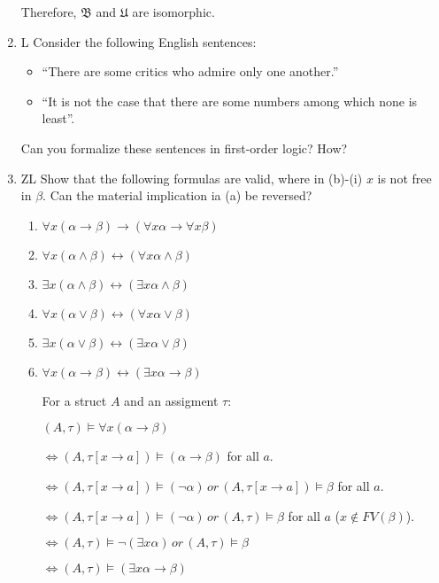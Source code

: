 \documentclass[12pt]{article}
\begin{document}
\begin{enumerate}
     Therefore, $\mathfrak{B}$ and $\mathfrak{U}$ are isomorphic.
		\item
		L Consider the following English sentences:
		\begin{itemize}
			\item
			``There are some critics who admire only one another.''
			\item
			``It is not the case that there are some numbers among which none is
			least''.
		\end{itemize}
		Can you formalize these sentences in first-order logic? How?
		\item
		ZL Show that the following formulas are valid,
		where in (b)-(i) $x$ is not free in $\beta$.
		Can the material implication ia (a) be reversed?
		\begin{enumerate}
			\item
			$\forall x (\alpha \rightarrow \beta) \rightarrow
			(\forall x \alpha \rightarrow \forall x \beta)$
			\item
			$\forall x (\alpha \wedge \beta) \leftrightarrow
			(\forall x \alpha \wedge \beta)$
			\item
			$\exists x (\alpha \wedge \beta) \leftrightarrow
			(\exists x \alpha \wedge \beta)$
			\item
			$\forall x (\alpha \vee \beta) \leftrightarrow
			(\forall x \alpha \vee \beta)$
			\item
			$\exists x (\alpha \vee \beta) \leftrightarrow
			(\exists x \alpha \vee \beta)$
			
			\item
			$\forall x (\alpha \rightarrow \beta) \leftrightarrow
			(\exists x \alpha \rightarrow \beta)$
			
			For a struct $A$ and an assigment $\tau$:
			
			$(A,\tau)\models\forall x (\alpha \rightarrow \beta)$
			
		$\Leftrightarrow (A,\tau[x\to a])\models(\alpha \rightarrow \beta)$ for all $a$.
		
		$\Leftrightarrow (A,\tau[x\to a])\models(\neg \alpha) \,or\, (A,\tau[x\to a])\models \beta$ for all $a$.
		
		$\Leftrightarrow (A,\tau[x\to a])\models(\neg \alpha) \,or\, (A,\tau)\models \beta$ for all $a$ ($x\not\in FV(\beta)$).
		
		$\Leftrightarrow (A,\tau)\models\neg(\exists x \alpha) \,or\, (A,\tau)\models \beta$ 
		
			$\Leftrightarrow (A,\tau)\models(\exists x \alpha\to  \beta)$ 
		

\end{enumerate}
\end{enumerate}
\end{document}
